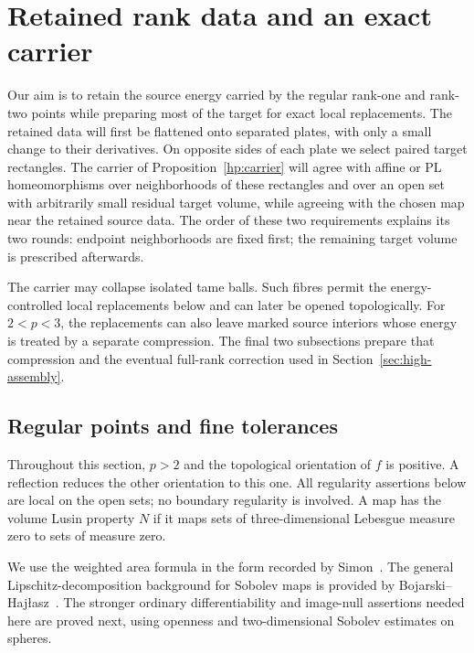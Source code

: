 \section{Retained rank data and an exact carrier}\label{sec:high-preparation}

Our aim is to retain the source energy carried by the regular rank-one
and rank-two points while preparing most of the target for exact local
replacements.  The retained data will first be flattened onto separated
plates, with only a small change to their derivatives.  On opposite
sides of each plate we select paired target rectangles.  The carrier
of Proposition~\ref{hp:carrier} will agree with affine or PL
homeomorphisms over neighborhoods of these rectangles and over an open
set with arbitrarily small residual target volume, while agreeing with
the chosen map near the retained source data.  The order of
these two requirements explains its two rounds: endpoint neighborhoods
are fixed first; the remaining target volume is prescribed afterwards.

The carrier may collapse isolated tame balls.  Such fibres permit the
energy-controlled local replacements below and can later be opened
topologically.  For $2<p<3$, the replacements can also leave marked
source interiors whose energy is treated by a separate compression.
The final two subsections prepare that compression and the eventual
full-rank correction used in Section~\ref{sec:high-assembly}.

\subsection{Regular points and fine tolerances}

Throughout this section, $p>2$ and the topological orientation of $f$
is positive.  A reflection reduces the other
orientation to this one.  All regularity assertions below are local on
the open sets; no boundary regularity is involved.  A map has the volume
Lusin property $N$ if it maps sets of three-dimensional Lebesgue
measure zero to sets of measure zero.

We use the weighted area formula in the form recorded by
Simon~\cite[Chapter~2, Section~3, Equations~(3.4)--(3.5)]{Simon2014Draft}.
The general Lipschitz-decomposition background for Sobolev maps is
provided by Bojarski--Haj\l asz~\cite[Theorem~3(1)]{BojarskiHajlasz1993}.
The stronger ordinary differentiability and image-null assertions
needed here are proved next, using openness and two-dimensional
Sobolev estimates on spheres.

